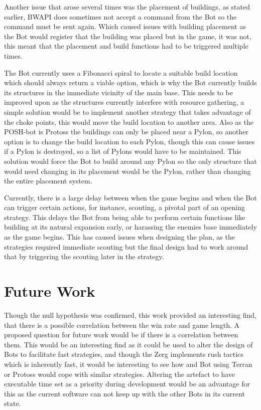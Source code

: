 \documentclass[journal]{IEEEtran}
\begin{document}
	Another issue that arose several times was the placement of buildings, as stated earlier, BWAPI does sometimes not accept a command from the Bot so the command must be sent again. Which caused issues with building placement as the Bot would register that the building was placed but in the game, it was not, this meant that the placement and build functions had to be triggered multiple times. 
	
	The Bot currently uses a Fibonacci spiral to locate a suitable build location which should always return a viable option, which is why the Bot currently builds its structures in the immediate vicinity of the main base. This needs to be improved upon as the structures currently interfere with resource gathering, a simple solution would be to implement another strategy that takes advantage of the choke points, this would move the build location to another area. Also as the POSH-bot is Protoss the buildings can only be placed near a Pylon, so another option is to change the build location to each Pylon, though this can cause issues if a Pylon is destroyed, so a list of Pylons would have to be maintained. This solution would force the Bot to build around any Pylon so the only structure that would need changing in its placement would be the Pylon, rather than changing the entire placement system.
	
	Currently, there is a large delay between when the game begins and when the Bot can trigger certain actions, for instance, scouting, a pivotal part of an opening strategy. This delays the Bot from being able to perform certain functions like building at its natural expansion early, or harassing the enemies base immediately as the game begins. This has caused issues when designing the plan, as the strategies required immediate scouting but the final design had to work around that by triggering the scouting later in the strategy.    
	
	\section{Future Work}
	Though the null hypothesis was confirmed, this work provided an interesting find, that there is a possible correlation between the win rate and game length. A proposed question for future work would be if there is a correlation between them. This would be an interesting find as it could be used to alter the design of Bots to facilitate fast strategies, and though the Zerg implements rush tactics which is inherently fast, it would be interesting to see how and Bot using Terran or Protoss would cope with similar strategies.
	Altering the artefact to have executable time set as a priority during development would be an advantage for this as the current software can not keep up with the other Bots in its current state.
	
\end{document}

